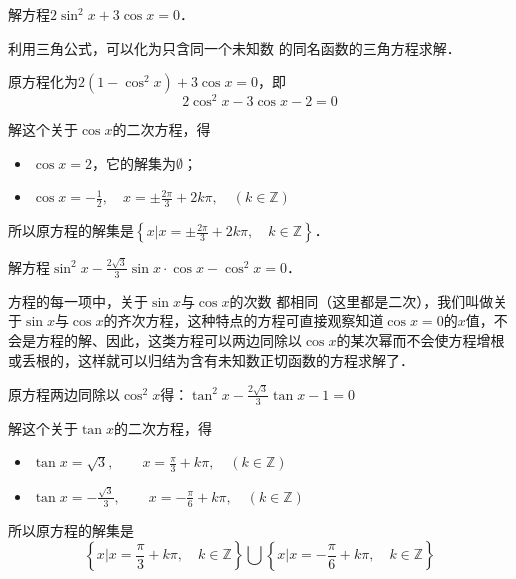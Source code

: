 \begin{example}
    解方程$2\sin^2x+3\cos x=0$．
\end{example}

\begin{analyze}
    利用三角公式，可以化为只含同一个未知数
的同名函数的三角方程求解．
\end{analyze}

\begin{solution}
    原方程化为$2(1-\cos^2x)+3\cos x=0$，即
\[2\cos^2x-3\cos x-2=0\]

解这个关于$\cos x$的二次方程，得
\begin{itemize}
    \item $\cos x=2$，它的解集为$\emptyset$；
    \item $\cos x=-\frac{1}{2},\quad x=\pm\frac{2\pi}{3}+2k\pi,\quad (k\in\mathbb{Z})$
\end{itemize}
所以原方程的解集是$\left\{x\Big|x=\pm \frac{2\pi}{3}+2k\pi,\quad k\in\mathbb{Z}\right\}$．
\end{solution}

\begin{example}
    解方程$\sin^2x-\frac{2\sqrt{3}}{3}\sin x\cdot \cos x-\cos^2x=0$．
\end{example}

\begin{analyze}
    方程的每一项中，关于$\sin x$与$\cos x$的次数
都相同（这里都是二次），我们叫做关于$\sin x$与$\cos x$的齐次方程，这种特点的方程可直接观察知道$\cos x=0$的$x$值，不会是方程的解、因此，这类方程可以两边同除以$\cos x$的某次幂而不会使方程增根或丢根的，这样就可以归结为含有未知数正切函数的方程求解了．
\end{analyze}

\begin{solution}
    原方程两边同除以$\cos^2x$得：$\tan^2x-\frac{2\sqrt{3}}{3}\tan x-1=0$

    解这个关于$\tan x$的二次方程，得
\begin{itemize}
    \item $\tan x=\sqrt{3},\qquad x=\frac{\pi}{3}+k\pi,\quad (k\in\mathbb{Z})$
    \item $\tan x=-\frac{\sqrt{3}}{3},\qquad x=-\frac{\pi}{6}+k\pi,\quad (k\in\mathbb{Z})$
\end{itemize}
所以原方程的解集是
\[\left\{x\Big|x=\frac{\pi}{3}+k\pi,\quad k\in\mathbb{Z} \right\}\bigcup \left\{x\Big| x=-\frac{\pi}{6}+k\pi,\quad k\in\mathbb{Z}\right\}\]

\end{solution}

